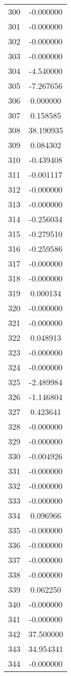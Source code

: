 \documentclass[12pt]{article}
\begin{document}
\begin{longtable}{@{}cc@{}}
300 & -0.000000 \\
301 & -0.000000 \\
302 & -0.000000 \\
303 & -0.000000 \\
304 & -4.540000 \\
305 & -7.267656 \\
306 & 0.000000 \\
307 & 0.158585 \\
308 & 38.190935 \\
309 & 0.084302 \\
310 & -0.439408 \\
311 & -0.001117 \\
312 & -0.000000 \\
313 & -0.000000 \\
314 & -0.256034 \\
315 & -0.279510 \\
316 & -0.259586 \\
317 & -0.000000 \\
318 & -0.000000 \\
319 & 0.000134 \\
320 & -0.000000 \\
321 & -0.000000 \\
322 & 0.048913 \\
323 & -0.000000 \\
324 & -0.000000 \\
325 & -2.489984 \\
326 & -1.146804 \\
327 & 0.423641 \\
328 & -0.000000 \\
329 & -0.000000 \\
330 & -0.004926 \\
331 & -0.000000 \\
332 & -0.000000 \\
333 & -0.000000 \\
334 & 0.096966 \\
335 & -0.000000 \\
336 & -0.000000 \\
337 & -0.000000 \\
338 & -0.000000 \\
339 & 0.062250 \\
340 & -0.000000 \\
341 & -0.000000 \\
342 & 37.500000 \\
343 & 34.954341 \\
344 & -0.000000 \\

\end{longtable}
\end{document}
